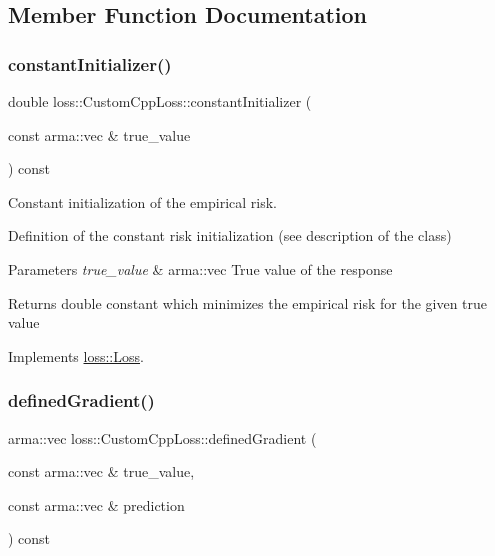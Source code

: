 \subsection{Member Function Documentation}
\mbox{\label{classloss_1_1_custom_cpp_loss_a7e3691161855a4a3152982274e74c96a}} 
\subsubsection{\texorpdfstring{constant\+Initializer()}{constantInitializer()}}
{\footnotesize\ttfamily double loss\+::\+Custom\+Cpp\+Loss\+::constant\+Initializer (\begin{DoxyParamCaption}\item[{const arma\+::vec \&}]{true\+\_\+value }\end{DoxyParamCaption}) const\hspace{0.3cm}{\ttfamily [virtual]}}



Constant initialization of the empirical risk. 

Definition of the constant risk initialization (see description of the class)


\begin{DoxyParams}{Parameters}
{\em true\+\_\+value} & {\ttfamily arma\+::vec} True value of the response\\
\hline
\end{DoxyParams}
\begin{DoxyReturn}{Returns}
{\ttfamily double} constant which minimizes the empirical risk for the given true value 
\end{DoxyReturn}


Implements \mbox{\hyperlink{classloss_1_1_loss_a65fe7dcd9370e6a549b8d1cc95fc8798}{loss\+::\+Loss}}.

\mbox{\label{classloss_1_1_custom_cpp_loss_a3ff741b3a4d4c3f3515660dcb7b32781}} 
\subsubsection{\texorpdfstring{defined\+Gradient()}{definedGradient()}}
{\footnotesize\ttfamily arma\+::vec loss\+::\+Custom\+Cpp\+Loss\+::defined\+Gradient (\begin{DoxyParamCaption}\item[{const arma\+::vec \&}]{true\+\_\+value,  }\item[{const arma\+::vec \&}]{prediction }\end{DoxyParamCaption}) const\hspace{0.3cm}{\ttfamily [virtual]}}



